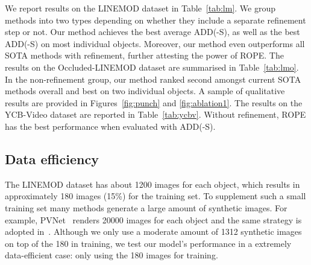 \documentclass[10pt,twocolumn,letterpaper]{article}
\begin{document}
We report results on the LINEMOD dataset in Table~\ref{tab:lm}. We group methods into two types depending on whether they include a separate refinement step or not. Our method achieves the best average ADD(-S),  as well as the best ADD(-S) on most individual objects. Moreover, our method even outperforms all SOTA methods with refinement, further attesting the power of ROPE.  
The results on the Occluded-LINEMOD dataset are summarised in Table~\ref{tab:lmo}. In the non-refinement group, our method ranked second amongst current SOTA methods overall and best on two individual objects. A sample of qualitative results are provided in Figures~\ref{fig:punch} and \ref{fig:ablation1}.
The results on the YCB-Video dataset are reported in Table~\ref{tab:ycbv}. Without refinement, ROPE has the best performance when evaluated with ADD(-S). 

\subsection{Data efficiency}
The LINEMOD dataset has about 1200 images for each object, which results in approximately 180 images (15\%) for the training set. To supplement such a small training set many methods generate a large amount of synthetic images. For example, 
PVNet~\cite{Peng2019pvnet} renders 20000 images for each object and the same strategy is adopted in~\cite{song2020hybridposev4}. Although we only use a moderate amount of 1312 synthetic images on top of the 180 in training, we test our model's performance in a extremely data-efficient case: only using the 180 images for training. 
\end{document}
